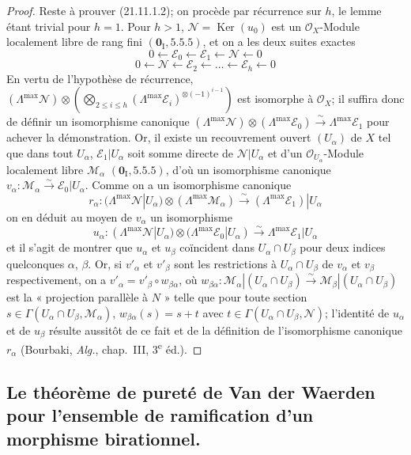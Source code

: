 \begin{proof}
Reste à prouver (21.11.1.2); on procède par récurrence sur $h$, le lemme étant trivial
pour $h=1$. Pour $h>1$, $\mathscr N=\operatorname{Ker}(u_0)$ est un
$\mathcal O_X$-Module localement libre de rang fini $(\mathbf 0_{\mathrm I}, 5.5.5)$,
et on a les deux suites exactes
\[
  0\leftarrow\mathscr E_0\leftarrow\mathscr E_1
  \leftarrow\mathscr N\leftarrow0
\]
\[
  0\leftarrow\mathscr N\leftarrow\mathscr E_2
  \leftarrow\ldots\leftarrow\mathscr E_h\leftarrow0
\]
En vertu de l'hypothèse de récurrence,
$(\Lambda^{\max}\mathscr N)\otimes
(\bigotimes_{2\leq i\leq h}(\Lambda^{\max}\mathscr E_i)^{\otimes(-1)^{i-1}})$
est isomorphe à $\mathcal O_X$; il suffira donc de définir un isomorphisme canonique
$(\Lambda^{\max}\mathscr N)\otimes(\Lambda^{\max}\mathscr E_0)\xrightarrow{\sim}\Lambda^{\max}\mathscr E_1$
pour achever la démonstration. Or, il existe un recouvrement ouvert $(U_\alpha)$ de
$X$ tel que dans tout $U_\alpha$, $\mathscr E_1|U_\alpha$ soit somme directe de
$\mathscr N|U_\alpha$ et d'un $\mathcal O_{U_\alpha}$-Module localement libre
$\mathscr M_\alpha$ $(\mathbf 0_{\mathrm I}, 5.5.5)$, d'où un isomorphisme canonique
$v_\alpha:\mathscr M_\alpha\xrightarrow{\sim}\mathscr E_0|U_\alpha$.
Comme on a un isomorphisme canonique
\[
  r_\alpha:(\Lambda^{\max}\mathscr N|U_\alpha)
  \otimes(\Lambda^{\max}\mathscr M_\alpha)
  \xrightarrow{\sim}(\Lambda^{\max}\mathscr E_1)|U_\alpha
\]
on en déduit au moyen de $v_\alpha$ un isomorphisme
\[
  u_\alpha:(\Lambda^{\max}\mathscr N|U_\alpha)
  \otimes(\Lambda^{\max}\mathscr E_0|U_\alpha)
  \xrightarrow{\sim}\Lambda^{\max}\mathscr E_1|U_\alpha
\]
et il s'agit de montrer que $u_\alpha$ et $u_\beta$ coïncident dans
$U_\alpha\cap U_\beta$ pour deux indices quelconques $\alpha$, $\beta$. Or, si
$v'_\alpha$ et $v'_\beta$ sont les restrictions à $U_\alpha\cap U_\beta$ de
$v_\alpha$ et $v_\beta$ respectivement, on a
$v'_\alpha=v'_\beta\circ w_{\beta\alpha}$, où
$w_{\beta\alpha}:\mathscr M_\alpha|(U_\alpha\cap U_\beta)\xrightarrow{\sim}\mathscr M_\beta|(U_\alpha\cap U_\beta)$
est la « projection parallèle à $N$ » telle que pour toute section
$s\in\Gamma(U_\alpha\cap U_\beta,\mathscr M_\alpha)$,
$w_{\beta\alpha}(s)=s+t$ avec
$t\in\Gamma(U_\alpha\cap U_\beta,\mathscr N)$; l'identité de $u_\alpha$ et de
$u_\beta$ résulte aussitôt de ce fait et de la définition de l'isomorphisme canonique
$r_\alpha$ (Bourbaki, \emph{Alg.}, chap.~III, 3\textsuperscript{e} éd.).
\end{proof}

\subsection{Le théorème de pureté de Van der Waerden pour l'ensemble de
ramification d'un morphisme birationnel.}
\label{IV.21.12}

